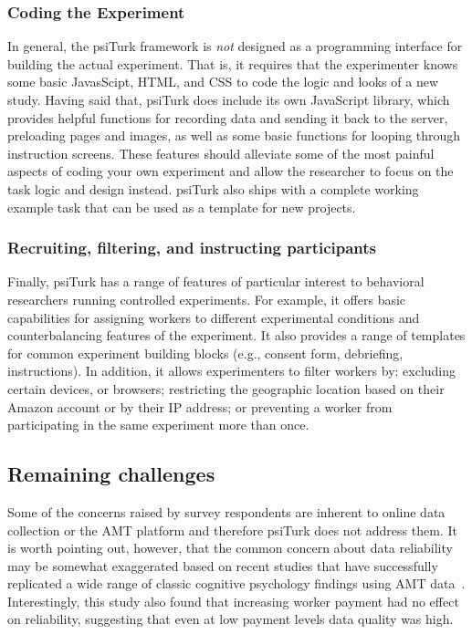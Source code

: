 \documentclass[twocolumn]{svjour3}          %
\begin{document}
\subsubsection{Coding the Experiment}
In general, the psiTurk framework is \emph{not} designed as a programming interface for building the actual experiment.
That is, it requires that the experimenter knows some basic JavasScipt, HTML, and CSS to code the logic and looks of a new study.
Having said that, psiTurk does include its own JavaScript library, which provides helpful functions for recording data and sending
it back to the server, preloading pages and images, as well as some basic functions for looping through instruction screens. These
features should alleviate some of the most painful aspects of coding your own experiment and allow the researcher to focus
on the task logic and design instead. psiTurk also ships with a complete working example task that can be used as a template for 
new projects.


\subsubsection{Recruiting, filtering, and instructing participants}
Finally, psiTurk has a range of features of particular interest to behavioral researchers
running controlled experiments. 
For example, it offers basic capabilities for assigning workers to different experimental conditions 
and counterbalancing features of the experiment. It also provides  a range of templates
for common experiment building blocks (e.g., consent form, debriefing, instructions).
In addition, it allows experimenters to filter workers by: excluding certain devices, or browsers; restricting the geographic location based on their Amazon account or by their IP address; or preventing a worker from participating in the same experiment more than once.




\subsection{Remaining challenges}
Some of the concerns raised by survey respondents are inherent to online data collection or the AMT platform and therefore psiTurk does
not address them.
It is worth pointing out, however, that the common concern about data reliability may be somewhat exaggerated based on recent studies that have successfully replicated a wide range of classic cognitive psychology findings using AMT data~\citep{crump2013evaluating}. Interestingly, this study also found that increasing worker payment had no effect on reliability, suggesting that even 
at low payment levels data quality was high. 
\end{document}
